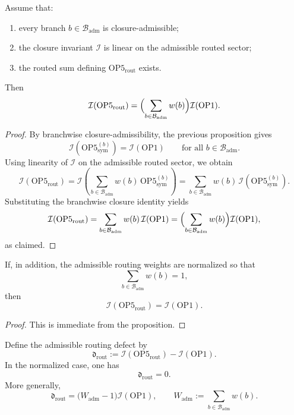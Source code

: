 \begin{proposition}\label{prop:op-admissible-routing}
Assume that:
\begin{enumerate}[leftmargin=2em,label=(\roman*)]
\item every branch $b\in\mathcal{B}_{\mathrm{adm}}$ is closure-admissible;
\item the closure invariant $\mathcal{I}$ is linear on the admissible routed sector;
\item the routed sum defining $\mathrm{OP5}_{\mathrm{rout}}$ exists.
\end{enumerate}
Then
\[
\mathcal{I}(\mathrm{OP5}_{\mathrm{rout}})
=
\Bigl(\sum_{b\in\mathcal{B}_{\mathrm{adm}}} w(b)\Bigr)\mathcal{I}(\mathrm{OP1}).
\]
\end{proposition}

\begin{proof}
By branchwise closure-admissibility, the previous proposition gives
\[
\mathcal{I}\!\left(\mathrm{OP5}^{(b)}_{\mathrm{sym}}\right)
=
\mathcal{I}(\mathrm{OP1})
\qquad
\text{for all } b\in\mathcal{B}_{\mathrm{adm}}.
\]
Using linearity of $\mathcal{I}$ on the admissible routed sector, we obtain
\[
\mathcal{I}(\mathrm{OP5}_{\mathrm{rout}})
=
\mathcal{I}\!\left(
\sum_{b\in\mathcal{B}_{\mathrm{adm}}} w(b)\,\mathrm{OP5}^{(b)}_{\mathrm{sym}}
\right)
=
\sum_{b\in\mathcal{B}_{\mathrm{adm}}} w(b)\,
\mathcal{I}\!\left(\mathrm{OP5}^{(b)}_{\mathrm{sym}}\right).
\]
Substituting the branchwise closure identity yields
\[
\mathcal{I}(\mathrm{OP5}_{\mathrm{rout}})
=
\sum_{b\in\mathcal{B}_{\mathrm{adm}}} w(b)\,\mathcal{I}(\mathrm{OP1})
=
\Bigl(\sum_{b\in\mathcal{B}_{\mathrm{adm}}} w(b)\Bigr)\mathcal{I}(\mathrm{OP1}),
\]
as claimed.
\end{proof}

\begin{corollary}
If, in addition, the admissible routing weights are normalized so that
\[
\sum_{b\in\mathcal{B}_{\mathrm{adm}}} w(b)=1,
\]
then
\[
\mathcal{I}(\mathrm{OP5}_{\mathrm{rout}})
=
\mathcal{I}(\mathrm{OP1}).
\]
\end{corollary}

\begin{proof}
This is immediate from the proposition.
\end{proof}

\begin{definition}
Define the admissible routing defect by
\[
\mathfrak{d}_{\mathrm{rout}}
:=
\mathcal{I}(\mathrm{OP5}_{\mathrm{rout}})
-
\mathcal{I}(\mathrm{OP1}).
\]
In the normalized case, one has
\[
\mathfrak{d}_{\mathrm{rout}}=0.
\]
More generally,
\[
\mathfrak{d}_{\mathrm{rout}}
=
\bigl(W_{\mathrm{adm}}-1\bigr)\mathcal{I}(\mathrm{OP1}),
\qquad
W_{\mathrm{adm}}:=\sum_{b\in\mathcal{B}_{\mathrm{adm}}} w(b).
\]
\end{definition}

